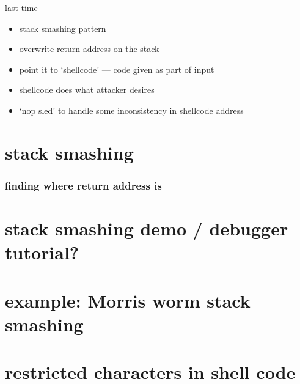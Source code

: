 \date{}
\title{}
\date{}

\begin{frame}
    \titlepage
\end{frame}



\begin{frame}{last time}
    \begin{itemize}
    \item stack smashing pattern
    \item overwrite return address on the stack
    \item point it to `shellcode' --- code given as part of input
    \item shellcode does what attacker desires
    \vspace{.5cm}
    \item `nop sled' to handle some inconsistency in shellcode address
    \end{itemize}
\end{frame}

\section{stack smashing}


\subsubsection{finding where return address is}


\section{stack smashing demo / debugger tutorial?}


\section{example: Morris worm stack smashing}



\section{restricted characters in shell code}
   

